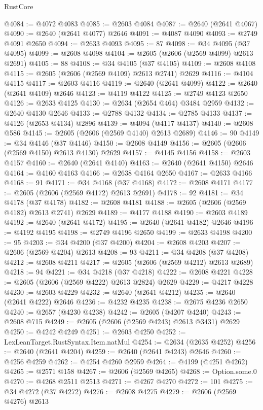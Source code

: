 \begin{lexlean}{RustCore}
\begin{coremodule}
@4084 := @4072 @4083
@4085 := @2603 @4084
@4087 := @2640 (@2641 @4067)
@4090 := @2640 (@2641 @4077) @2646
@4091 := @4087 @4090
@4093 := @2749 @4091 @2650
@4094 := @2633 @4093
@4095 := 87
@4098 := @34 @4095 (@37 @4095)
@4099 := @2608 @4098
@4104 := @2605 (@2606 (@2569 @4099) @2613 @2691)
@4105 := 88
@4108 := @34 @4105 (@37 @4105)
@4109 := @2608 @4108
@4115 := @2605 (@2606 (@2569 @4109) @2613 @2741) @2629
@4116 := @4104 @4115
@4117 := @2603 @4116
@4119 := @2640 (@2641 @4099)
@4122 := @2640 (@2641 @4109) @2646
@4123 := @4119 @4122
@4125 := @2749 @4123 @2650
@4126 := @2633 @4125
@4130 := @2634 (@2654 @464) @3484 @2959
@4132 := @2640 @4130 @2646
@4133 := @2788 @4132
@4134 := @2785 @4133
@4137 := @4126 (@2653 @4134) @2896
@4139 := @4094 (@4117 @4137)
@4140 := @2608 @586
@4145 := @2605 (@2606 (@2569 @4140) @2613 @2689)
@4146 := 90
@4149 := @34 @4146 (@37 @4146)
@4150 := @2608 @4149
@4156 := @2605 (@2606 (@2569 @4150) @2613 @4130) @2629
@4157 := @4145 @4156
@4158 := @2603 @4157
@4160 := @2640 (@2641 @4140)
@4163 := @2640 (@2641 @4150) @2646
@4164 := @4160 @4163
@4166 := @2638 @4164 @2650
@4167 := @2633 @4166
@4168 := 91
@4171 := @34 @4168 (@37 @4168)
@4172 := @2608 @4171
@4177 := @2605 (@2606 (@2569 @4172) @2613 @2691)
@4178 := 92
@4181 := @34 @4178 (@37 @4178)
@4182 := @2608 @4181
@4188 := @2605 (@2606 (@2569 @4182) @2613 @2741) @2629
@4189 := @4177 @4188
@4190 := @2603 @4189
@4192 := @2640 (@2641 @4172)
@4195 := @2640 (@2641 @4182) @2646
@4196 := @4192 @4195
@4198 := @2749 @4196 @2650
@4199 := @2633 @4198
@4200 := 95
@4203 := @34 @4200 (@37 @4200)
@4204 := @2608 @4203
@4207 := @2606 (@2569 @4204) @2613
@4208 := 93
@4211 := @34 @4208 (@37 @4208)
@4212 := @2608 @4211
@4217 := @2605 (@2606 (@2569 @4212) @2613 @2689)
@4218 := 94
@4221 := @34 @4218 (@37 @4218)
@4222 := @2608 @4221
@4228 := @2605 (@2606 (@2569 @4222) @2613 @2824) @2629
@4229 := @4217 @4228
@4230 := @2603 @4229
@4232 := @2640 (@2641 @4212)
@4235 := @2640 (@2641 @4222) @2646
@4236 := @4232 @4235
@4238 := @2675 @4236 @2650
@4240 := @2657 (@4230 @4238)
@4242 := @2605 (@4207 @4240)
@4243 := @2608 @715
@4249 := @2605 (@2606 (@2569 @4243) @2613 @3431) @2629
@4250 := @4242 @4249
@4251 := @2603 @4250
@4252 := LexLeanTarget.RustSyntax.Item.natMul
@4254 := @2634 (@2635 @4252)
@4256 := @2640 (@2641 @4204)
@4259 := @2640 (@2641 @4243) @2646
@4260 := @4256 @4259
@4262 := @4254 @4260 @2959
@4264 := @4199 (@4251 @4262)
@4265 := @2571 @158
@4267 := @2606 (@2569 @4265)
@4268 := Option.some.{0}
@4270 := @4268 @2511 @2513
@4271 := @4267 @4270
@4272 := 101
@4275 := @34 @4272 (@37 @4272)
@4276 := @2608 @4275
@4279 := @2606 (@2569 @4276) @2613

\end{coremodule}
\end{lexlean}
